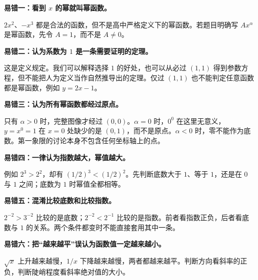 \clearpage
\begin{trapbox}
  
    \textbf{\textcolor{CTrap}{易错一：看到 $x$ 的幂就叫幂函数。}}


      $2x^2$、$-x^3$ 都是合法的函数，但不是高中严格定义下的幂函数。若题目明确写 $Ax^\alpha$ 是幂函数，先令 $A=1$，而不是 $A\ne0$。
    
\end{trapbox}
\clearpage
\begin{trapbox}
\textbf{\textcolor{CTrap}{易错二：认为系数为 $1$ 是一条需要证明的定理。}}


      这是定义规定。我们可以解释选择 $1$ 的好处，也可以从必过 $(1,1)$ 得到参数方程，但不能把人为定义当作自然推导出的定理。仅过 $(1,1)$ 也不能判定任意函数都是幂函数，例如 $y=2x-1$。
    
\end{trapbox}
\clearpage
\begin{trapbox}
\textbf{\textcolor{CTrap}{易错三：认为所有幂函数都经过原点。}}


      只有 $\alpha>0$ 时，完整图像才经过 $(0,0)$。$\alpha=0$ 时，$0^0$ 在这里无意义，$y=x^0=1$ 在 $x=0$ 处缺少的是 $(0,1)$，而不是原点。$\alpha<0$ 时，零不能作为底数。第一象限的讨论本身不包含任何坐标轴上的点。
    
\end{trapbox}
\clearpage
\begin{trapbox}
\textbf{\textcolor{CTrap}{易错四：一律认为指数越大，幂值越大。}}


      例如 $2^3>2^2$，却有 $(1/2)^3<(1/2)^2$。先判断底数大于 $1$、等于 $1$，还是在 $0$ 与 $1$ 之间；底数为 $1$ 时幂值全都相等。
    
\end{trapbox}
\clearpage
\begin{trapbox}
\textbf{\textcolor{CTrap}{易错五：混淆比较底数和比较指数。}}


      $2^{-2}>3^{-2}$ 比较的是底数；$2^{-2}<2^{-1}$ 比较的是指数。前者看指数正负，后者看底数与 $1$ 的关系。两个条件都变时不能直接套用其中一条。
    
\end{trapbox}
\clearpage
\begin{trapbox}
\textbf{\textcolor{CTrap}{易错六：把“越来越平”误认为函数值一定越来越小。}}


      $\sqrt{x}$ 上升越来越慢，$1/x$ 下降越来越慢，两者都越来越平。判断方向看斜率的正负，判断陡峭程度看斜率绝对值的大小。
    
\end{trapbox}
